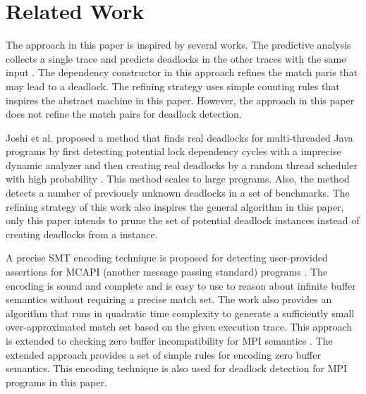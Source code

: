 \section{Related Work}
The approach in this paper is inspired by several works. The predictive analysis collects a single trace and predicts deadlocks in the other traces with the same input  \cite{DBLP:conf/sc/SharmaGB12,Subodh:Dissertation}. The dependency constructor in this approach refines the match paris that may lead to a deadlock. The refining strategy uses simple counting rules that inspires the abstract machine in this paper. However, the approach in this paper does not refine the match pairs for deadlock detection.

Joshi et al. proposed a method that finds real deadlocks for multi-threaded Java programs by first detecting potential lock dependency cycles with a imprecise dynamic analyzer and then creating real deadlocks by a random thread scheduler with high probability \cite{DBLP:conf/pldi/JoshiPSN09}. This method scales to large programs. Also, the method detects a number of previously unknown deadlocks in a set of benchmarks. The refining strategy of this work also inspires the general algorithm in this paper, only this paper intends to prune the set of potential deadlock instances instead of creating deadlocks from a instance.

A precise SMT encoding technique is proposed for detecting user-provided assertions for MCAPI (another message passing standard) programs \cite{DBLP:conf/kbse/HuangMM13}. The encoding is sound and complete and is easy to use to reason about infinite buffer semantics without requiring a precise match set. The work also provides an algorithm that runs in quadratic time complexity to generate a sufficiently small over-approximated match set based on the given execution trace. This approach is extended to checking zero buffer incompatibility for MPI semantics \cite{HuangNFM15}. The extended approach provides a set of simple rules for encoding zero buffer semantics. This encoding technique is also used for deadlock detection for MPI programs in this paper.


